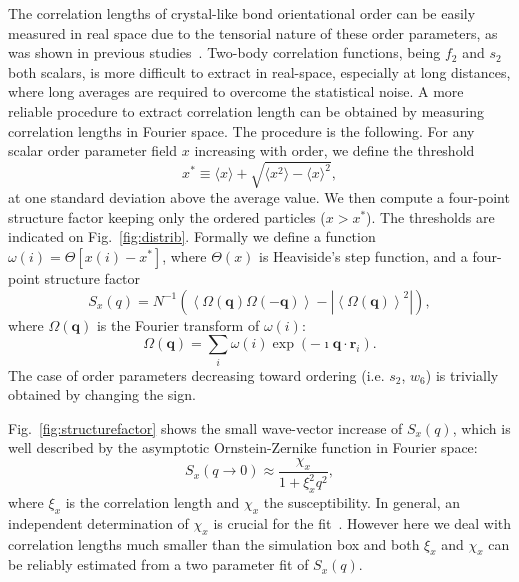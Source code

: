 \documentclass[twocolumn,superscriptaddress]{revtex4-1}
\begin{document}
The correlation lengths of crystal-like bond orientational order can be easily measured in real space due to the tensorial nature
of these order parameters, as was shown in previous studies~\cite{tanaka,kawasaki,mathieu_icosahedra,russo_gcm,russo_hs}. Two-body
correlation functions, being $f_2$ and $s_2$ both scalars, is more difficult to extract in real-space, especially at long distances,
where long averages are required to overcome the statistical noise. A more reliable procedure to extract correlation length can
be obtained by measuring correlation lengths in Fourier space.
The procedure is the following.
For any scalar order parameter field $x$ increasing with order, we define the threshold 
\begin{equation}
x^* \equiv \langle x\rangle + \sqrt{\langle x^2\rangle - \langle x\rangle^2},
\label{eq:xstar}
\end{equation}
at one standard deviation above the average value. We then compute a four-point structure factor keeping only the ordered particles ($x>x^*$). The thresholds are indicated on Fig.~\ref{fig:distrib}. Formally we define a function $\omega(i) = \Theta [x(i) - x^*]$, where $\Theta(x)$ is Heaviside’s step function, and a four-point structure factor
\begin{equation}
	S_x(q) = N^{-1}(\left\langle \Omega(\mathbf{q}) \Omega(-\mathbf{q}) \right\rangle - | \left\langle \Omega(\mathbf{q}) \right\rangle^2 |),   
	\label{eq:StrutureFactor}
\end{equation}
where $\Omega(\mathbf{q})$ is the Fourier transform of $\omega(i)$: 
\begin{equation}
	\Omega(\mathbf{q}) = \sum_i \omega(i)\exp(-\imath \mathbf{q}\cdot\mathbf{r}_i).  
\end{equation}
The case of order parameters decreasing toward ordering (i.e. $s_2$, $w_6$) is trivially obtained by changing the sign.

Fig.~\ref{fig:structurefactor} shows the small wave-vector increase of $S_x(q)$, which is well described by the asymptotic Ornstein-Zernike function in Fourier space:
\begin{equation}
	S_x(q\rightarrow 0) \approx \frac{\chi_x}{1+\xi_x^2 q^2},
	\label{eq:OZ_Fourier}
\end{equation}
where $\xi_x$ is the correlation length and $\chi_x$ the susceptibility. In general, an independent determination of $\chi_x$ is crucial for the fit~\cite{Flenner2011}. However here we deal with correlation lengths much smaller than the simulation box and both $\xi_x$ and $\chi_x$ can be reliably estimated from a two parameter fit of $S_x(q)$.
\end{document}
